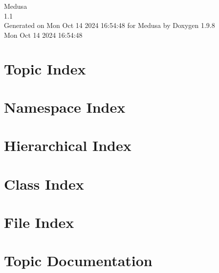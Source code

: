 \documentclass[twoside]{book}
\newcommand{\+}{\discretionary{\mbox{\scriptsize$\hookleftarrow$}}{}{}}
\newcommand{\clearemptydoublepage}{%
    \newpage{\pagestyle{empty}\cleardoublepage}%
  }
\begin{document}
  \raggedbottom
    \hypersetup{pageanchor=false,
                bookmarksnumbered=true,
                pdfencoding=unicode
               }
  \begin{titlepage}
  \vspace*{7cm}
  \begin{center}%
  {\Large Medusa}\\
  [1ex]\large 1.\+1 \\
  \vspace*{1cm}
  {\large Generated on Mon Oct 14 2024 16\+:54\+:48 for Medusa by Doxygen 1.9.8}\\
    \vspace*{0.5cm}
    {\small Mon Oct 14 2024 16:54:48}
  \end{center}
  \end{titlepage}
  \clearemptydoublepage
  \tableofcontents
  \clearemptydoublepage
  \hypersetup{pageanchor=true}


\chapter{Topic Index}

\chapter{Namespace Index}

\chapter{Hierarchical Index}

\chapter{Class Index}

\chapter{File Index}

\chapter{Topic Documentation}








\end{document}
